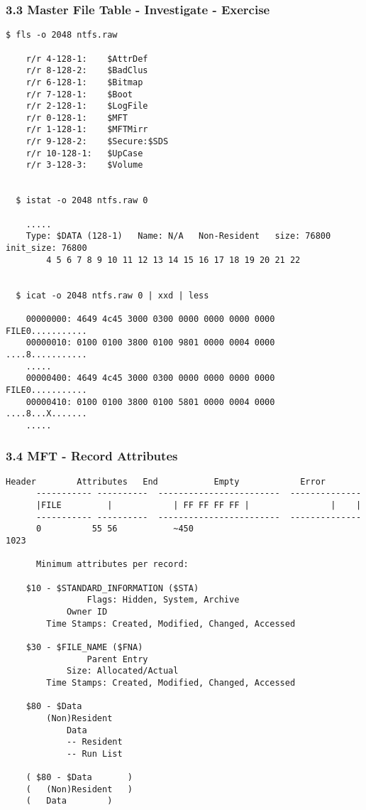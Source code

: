 \begin{frame}[fragile]
  \frametitle{3.3 Master File Table - Investigate - Exercise}
  \begin{lstlisting}[basicstyle=\tiny]
  $ fls -o 2048 ntfs.raw

	r/r 4-128-1:	$AttrDef
	r/r 8-128-2:	$BadClus
	r/r 6-128-1:	$Bitmap
	r/r 7-128-1:	$Boot
	r/r 2-128-1:	$LogFile
	r/r 0-128-1:	$MFT
	r/r 1-128-1:	$MFTMirr
	r/r 9-128-2:	$Secure:$SDS
	r/r 10-128-1:	$UpCase
	r/r 3-128-3:	$Volume


  $ istat -o 2048 ntfs.raw 0

	.....
	Type: $DATA (128-1)   Name: N/A   Non-Resident   size: 76800  init_size: 76800
        4 5 6 7 8 9 10 11 12 13 14 15 16 17 18 19 20 21 22


  $ icat -o 2048 ntfs.raw 0 | xxd | less

	00000000: 4649 4c45 3000 0300 0000 0000 0000 0000  FILE0...........
	00000010: 0100 0100 3800 0100 9801 0000 0004 0000  ....8...........
	.....
	00000400: 4649 4c45 3000 0300 0000 0000 0000 0000  FILE0...........
	00000410: 0100 0100 3800 0100 5801 0000 0004 0000  ....8...X.......
	.....
  \end{lstlisting}
\end{frame}


\begin{frame}[fragile]
  \frametitle{3.4 MFT - Record Attributes}
  \begin{lstlisting}[basicstyle=\tiny]
      Header        Attributes   End           Empty            Error
      ----------- ----------  ------------------------  --------------
      |FILE         |            | FF FF FF FF |                |    |
      ----------- ----------  ------------------------  --------------
      0          55 56           ~450                                1023

      Minimum attributes per record:

	$10 - $STANDARD_INFORMATION ($STA)
                Flags: Hidden, System, Archive
	        Owner ID
		Time Stamps: Created, Modified, Changed, Accessed

	$30 - $FILE_NAME ($FNA)
                Parent Entry
	        Size: Allocated/Actual
		Time Stamps: Created, Modified, Changed, Accessed

	$80 - $Data
		(Non)Resident
	        Data
		    -- Resident
		    -- Run List

	( $80 - $Data		)
	(	(Non)Resident	)
	(	Data		)
  \end{lstlisting}
\end{frame}


